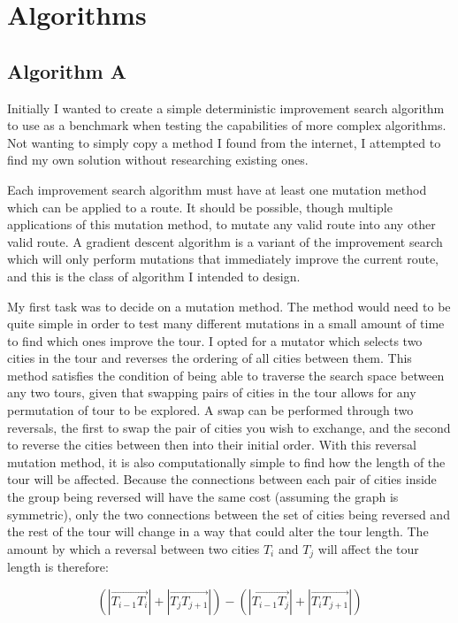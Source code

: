 \documentclass[a4paper,11pt]{article}
\begin{document}
\section{Algorithms}
\subsection{Algorithm A}
Initially I wanted to create a simple deterministic improvement search
algorithm to use as a benchmark when testing the capabilities of more complex
algorithms. Not wanting to simply copy a method I found from the internet, I
attempted to find my own solution without researching existing ones.

Each improvement search algorithm must have at least one mutation method which
can be applied to a route. It should be possible, though multiple applications
of this mutation method, to mutate any valid route into any other valid route.
A gradient descent algorithm is a variant of the improvement search which will
only perform mutations that immediately improve the current route, and this is
the class of algorithm I intended to design.

My first task was to decide on a mutation method. The method would need to be
quite simple in order to test many different mutations in a small amount of
time to find which ones improve the tour. I opted for a mutator which selects
two cities in the tour and reverses the ordering of all cities between them.
This method satisfies the condition of being able to traverse the search space
between any two tours, given that swapping pairs of cities in the tour allows
for any permutation of tour to be explored. A swap can be performed through two
reversals, the first to swap the pair of cities you wish to exchange, and the
second to reverse the cities between then into their initial order. With this
reversal mutation method, it is also computationally simple to find how the
length of the tour will be affected. Because the connections between each pair
of cities inside the group being reversed will have the same cost (assuming the
graph is symmetric), only the two connections between the set of cities being
reversed and the rest of the tour will change in a way that could alter the
tour length. The amount by which a reversal between two cities $T_i$ and $T_j$
will affect the tour length is therefore:

$$(|\overrightarrow{{T_{i-1}}{T_i}}|
+ |\overrightarrow{{T_j}{T_{j+1}}}|)
- (|\overrightarrow{{T_{i-1}}{T_j}}|
+ |\overrightarrow{{T_i}{T_{j+1}}}|)$$
\end{document}
